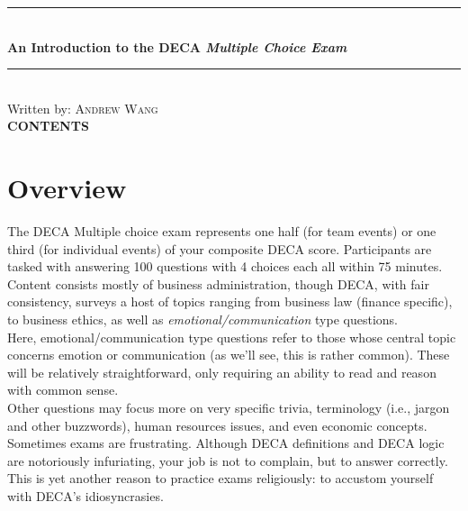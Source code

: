 \documentclass[12pt]{article}
\makeatletter
\newcommand*{\toccontents}{\@starttoc{toc}}
\newcounter{choice}
\makeatother
\begin{document}
\thispagestyle{empty}


	\newcommand{\HRule}{\rule{\linewidth}{0.5mm}} 
	\begin{center}

	\HRule\\[0.4cm]
	
	{\huge\bfseries An Introduction to the DECA \textit{Multiple Choice Exam}}\\[0.4cm] 
	
	\HRule\\[0.4cm]
	{Written by: \textsc{Andrew Wang}} \\[1cm]
	{\large\bfseries \textsc{CONTENTS}}\\[0.4cm] 
	\vspace*{.5\baselineskip}
	\toccontents
	\end{center}
	
 \vspace*{2\baselineskip}
\section{Overview}

	The DECA Multiple choice exam represents one half (for team events) or one third (for individual events) of your composite DECA score. Participants are tasked with answering 100 questions with 4 choices each all within 75 minutes. Content consists mostly of business administration, though DECA, with fair consistency, surveys a host of topics ranging from business law (finance specific), to business ethics, as well as \textit{emotional/communication} type questions. \\
	
	Here, emotional/communication type questions refer to those whose central topic concerns emotion or communication (as we'll see, this is rather common). These will be relatively straightforward, only requiring an ability to read and reason with common sense. \\
	
	Other questions may focus more on very specific trivia, terminology (i.e., jargon and other buzzwords), human resources issues, and even economic concepts. \\
	
	Sometimes exams are frustrating. Although DECA definitions and DECA logic are notoriously infuriating, your job is not to complain, but to answer correctly. This is yet another reason to practice exams religiously: to accustom yourself with DECA's idiosyncrasies. \\
	
\end{document}
